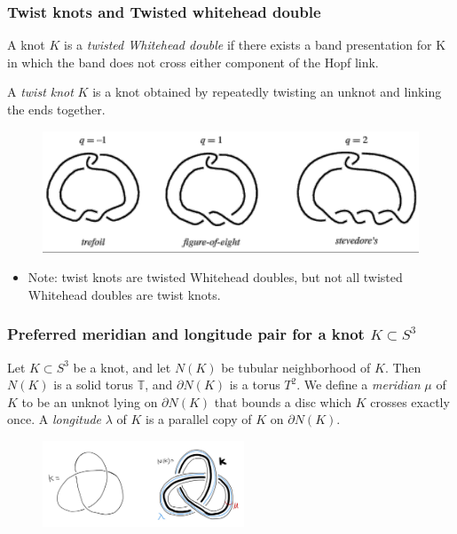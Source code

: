 \documentclass{beamer}
\theoremstyle{ex}
\theoremstyle{rem}
\begin{document}
	\begin{frame}
		\frametitle{Twist knots and Twisted whitehead double}
		\begin{definition}
			A knot $K$ is a \textit{twisted Whitehead double} if there exists a band presentation for K in which the band does not cross either component of the Hopf link. 
		\end{definition}
		\begin{definition}
			A \textit{twist knot} $K$ is a knot obtained by repeatedly twisting an unknot and linking the ends together.
		\end{definition}
			\begin{figure}
				{\includegraphics[scale=0.6] {twistknot}}
			\end{figure}
		
		\begin{itemize}
			\item Note: twist knots are twisted Whitehead doubles, but not all twisted Whitehead doubles are twist knots.
		\end{itemize}
	\end{frame}



	\begin{frame}
		\frametitle{Preferred meridian and longitude pair for a knot $K \subset S^3$}
		\begin{definition} 
		Let $K \subset S^3$ be a knot, and let $N(K)$ be tubular neighborhood of $K$. Then $N(K)$ is a solid torus $\mathbb{T}$, and $\partial N(K)$ is a torus $T^2$. We define a \textit{meridian} $\mu$ of $K$ to be an unknot lying on $\partial N(K)$ that bounds a disc which $K$ crosses exactly once. A \textit{longitude} $\lambda$ of $K$ is a parallel copy of $K$ on $\partial N(K)$.
		\end{definition}
		\begin{figure}
			\centering
			\includegraphics[width=60mm]{N(K).jpg}
		\end{figure}
		
	\end{frame}	
\end{document}
